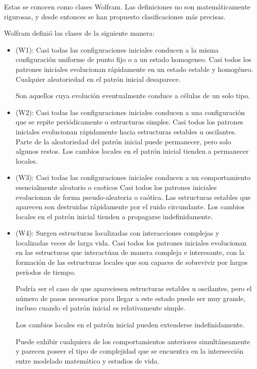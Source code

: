\documentclass[12pt, fleqn]{report}                             %
\theoremstyle{break}                                            %
\begin{document}
      Estas se conocen como clases Wolfram. 
      Las definiciones no son matemáticamente rigurosas, y desde entonces se han propuesto 
      clasificaciones más precisas.

      Wolfram definió las clases de la siguiente manera:
      \begin{itemize}
        \item (W1): Casi todas las configuraciones iniciales conducen a la misma configuración uniforme de punto fijo o a un 
        estado homogeneo. Casi todos los patrones iniciales evolucionan rápidamente en un estado estable 
        y homogéneo. Cualquier aleatoriedad en el patrón inicial desaparece.

        Son aquellos cuya evolución eventualmente conduce a células de un solo tipo.

        \item (W2): Casi todas las configuraciones iniciales conducen a una configuración que se repite periódicamente o estructuras
        simples.
        Casi todos los patrones iniciales evolucionan rápidamente hacia estructuras estables u 
        oscilantes. Parte de la aleatoriedad del patrón inicial 
        puede permanecer, pero solo algunos restos. Los cambios locales en el 
        patrón inicial tienden a permanecer locales.

        \item (W3): Casi todas las configuraciones iniciales conducen a un comportamiento esencialmente aleatorio o caoticos
        Casi todos los patrones iniciales evolucionan de forma pseudo-aleatoria o caótica.
         Las estructuras estables que aparecen son destruidas rápidamente por el ruido circundante. 
         Los cambios locales en el patrón inicial tienden a propagarse indefinidamente.
        
        \item (W4): Surgen estructuras localizadas con interacciones complejas y localizadas veces de larga vida. 
          Casi todos los patrones iniciales evolucionan en las estructuras que interactúan de 
          manera compleja e interesante, con la formación de las estructuras locales 
          que son capaces de sobrevivir por largos períodos de tiempo. 
          
          Podría ser el caso de que apareciesen estructuras estables u oscilantes, 
          pero el número de pasos necesarios para llegar a este estado puede ser muy grande, 
          incluso cuando el patrón inicial es relativamente simple. 
          
          Los cambios locales en el patrón inicial pueden extenderse indefinidamente.

          Puede exhibir cualquiera de los comportamientos anteriores
          simultáneamente y parecen poseer el tipo de complejidad
          que se encuentra en la intersección entre modelado matemático y
          estudios de vida.
      \end{itemize}
\end{document}
